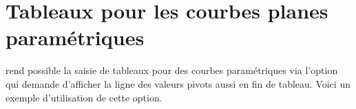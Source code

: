 \documentclass[10pt, a4paper]{article}
\begin{document}
\section{Tableaux pour les courbes planes paramétriques}

 rend possible la saisie de tableaux pour des courbes paramétriques via l'option  qui demande d'afficher la ligne des valeurs pivots aussi en fin de tableau. Voici un exemple d'utilisation de cette option. 
\end{document}
